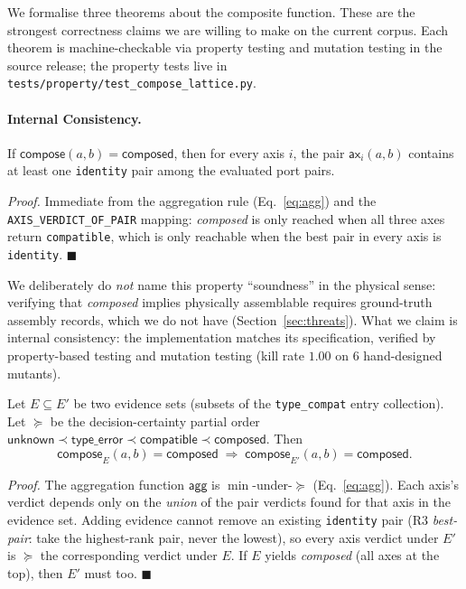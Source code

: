 \documentclass[review]{elsarticle}
\begin{document}
We formalise three theorems about the composite function. These
are the strongest correctness claims we are willing to make on
the current corpus. Each theorem is machine-checkable via property
testing and mutation testing in the source release; the property
tests live in \texttt{tests/property/test\_compose\_lattice.py}.

\paragraph{Internal Consistency.}
\begin{definition}
If $\mathsf{compose}(a, b) = \mathsf{composed}$, then for every
axis $i$, the pair $\mathsf{ax}_i(a, b)$ contains at least one
\texttt{identity} pair among the evaluated port pairs.
\end{definition}

\emph{Proof.} Immediate from the aggregation rule (Eq.~\ref{eq:agg})
and the \texttt{AXIS\_VERDICT\_OF\_PAIR} mapping: \emph{composed}
is only reached when all three axes return \texttt{compatible},
which is only reachable when the best pair in every axis is
\texttt{identity}. $\blacksquare$

We deliberately do \emph{not} name this property ``soundness'' in
the physical sense: verifying that \emph{composed} implies physically
assemblable requires ground-truth assembly records, which we do
not have (Section~\ref{sec:threats}). What we claim is internal
consistency: the implementation matches its specification, verified
by property-based testing and mutation testing (kill rate $1.00$
on $6$ hand-designed mutants).

\begin{theorem}
\label{thm:monotonicity}
Let $E \subseteq E'$ be two evidence sets (subsets of the
\texttt{type\_compat} entry collection). Let $\succeq$ be the
decision-certainty partial order
$\mathsf{unknown} \prec \mathsf{type\_error} \prec
\mathsf{compatible} \prec \mathsf{composed}$. Then
\begin{equation}
  \mathsf{compose}_E(a, b) = \mathsf{composed}
  \;\Longrightarrow\;
  \mathsf{compose}_{E'}(a, b) = \mathsf{composed}.
\end{equation}
\end{theorem}

\emph{Proof.} The aggregation function $\mathsf{agg}$ is
$\min$-under-$\succeq$ (Eq.~\ref{eq:agg}). Each axis's verdict
depends only on the \emph{union} of the pair verdicts found for
that axis in the evidence set. Adding evidence cannot remove an
existing \texttt{identity} pair (R3 \emph{best-pair}: take the
highest-rank pair, never the lowest), so every axis verdict under
$E'$ is $\succeq$ the corresponding verdict under $E$. If $E$
yields \emph{composed} (all axes at the top), then $E'$ must too.
$\blacksquare$
\end{document}
